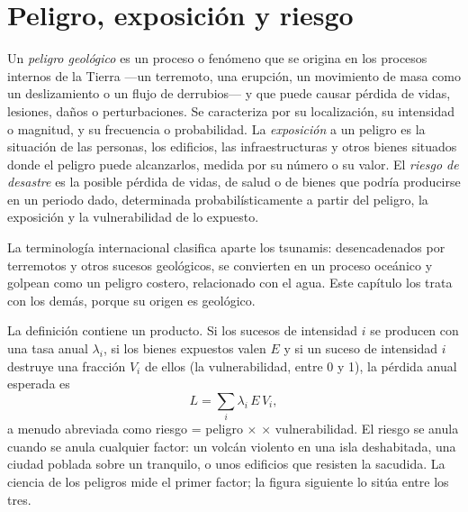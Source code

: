 \section{Peligro, exposición y riesgo}\label{sec:b2:geological-hazards:risk}

\begin{definition}\label{def:b2:geological-hazards:risk}
Un \emph{peligro geológico} es un proceso o fenómeno que se origina en
los procesos internos de la Tierra ---un terremoto, una erupción, un movimiento de masa como un
deslizamiento o un flujo de derrubios--- y que puede causar pérdida de vidas, lesiones, daños o perturbaciones. Se
caracteriza por su localización, su intensidad o magnitud, y su frecuencia o probabilidad. La
\emph{exposición} a un peligro es la situación de las personas,
los edificios, las infraestructuras y otros bienes situados donde el peligro puede alcanzarlos, medida por su
número o su valor. El \emph{riesgo de desastre} es la posible pérdida de vidas,
de salud o de bienes que podría producirse en un periodo dado, determinada probabilísticamente a partir del
peligro, la exposición y la vulnerabilidad de lo expuesto.
\end{definition}

La terminología internacional clasifica aparte los tsunamis: desencadenados por terremotos y otros
sucesos geológicos, se convierten en un proceso oceánico y golpean como un peligro costero, relacionado con el agua.
Este capítulo los trata con los demás, porque su origen es geológico.

La definición contiene un producto. Si los sucesos de intensidad $i$ se producen con una tasa anual
$\lambda_i$, si los bienes expuestos valen $E$ y si un suceso de intensidad $i$ destruye una
fracción $V_i$ de ellos (la vulnerabilidad, entre 0 y 1), la pérdida anual esperada es
\begin{equation}
L = \sum_i \lambda_i \, E \, V_i ,
\label{eq:b2:geological-hazards:loss}
\end{equation}
a menudo abreviada como riesgo = peligro $\times$  $\times$ vulnerabilidad. El riesgo se anula cuando
se anula cualquier factor: un volcán violento en una isla deshabitada, una ciudad poblada sobre un  tranquilo, o
unos edificios que resisten la sacudida. La ciencia de los peligros mide el primer factor; la figura siguiente
lo sitúa entre los tres.

